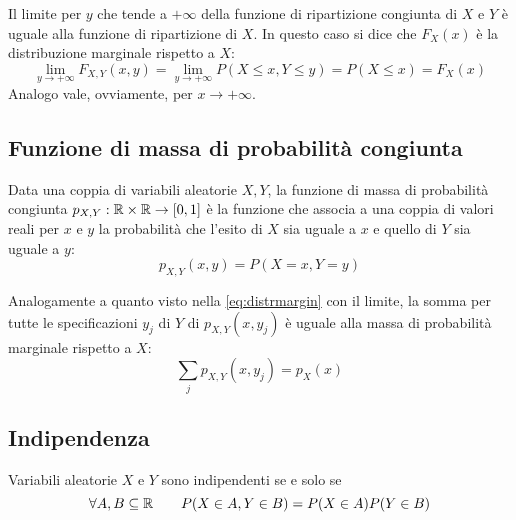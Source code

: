 Il limite per $y$ che tende a $+\infty$ della funzione di ripartizione congiunta di $X$ e $Y$ è uguale alla funzione di ripartizione di $X$. In questo caso si dice che $F_X(x)$ è la distribuzione marginale rispetto a $X$:
\begin{equation} \label{eq:distrmargin}
	\lim_{y\to+\infty}F_{X,Y}(x, y) = \lim_{y\to+\infty}P(X\leq x,Y\leq y) = P(X\leq x) = F_X(x)
\end{equation}
Analogo vale, ovviamente, per $x\to+\infty$.



\subsection{Funzione di massa di probabilità congiunta}
\begin{defin}
	Data una coppia di variabili aleatorie $X, Y$, la funzione di massa di probabilità congiunta $p_{X,Y}:\mathbb R\times\mathbb R\to[0,1]$ è la funzione che associa a una coppia di valori reali per $x$ e $y$ la probabilità che l'esito di $X$ sia uguale a $x$ e quello di $Y$ sia uguale a $y$:
	\begin{equation*}
		p_{X,Y}(x,y)=P(X=x,Y=y)
	\end{equation*}
\end{defin}

Analogamente a quanto visto nella \eqref{eq:distrmargin} con il limite, la somma per tutte le specificazioni $y_j$ di $Y$ di $p_{X,Y}(x,y_j)$ è uguale alla massa di probabilità marginale rispetto a $X$:
\begin{equation} \label{eq:massamargin}
	\sum_j p_{X,Y}(x,y_j) = p_X(x)
\end{equation}




\subsection{Indipendenza}
\begin{defin}
	Variabili aleatorie $X$ e $Y$ sono indipendenti se e solo se
	\begin{equation*}
		\forall A,B\subseteq\mathbb R\qquad P(X\in A, Y\in B)=P(X\in A)P(Y\in B)
	\end{equation*}
\end{defin}

